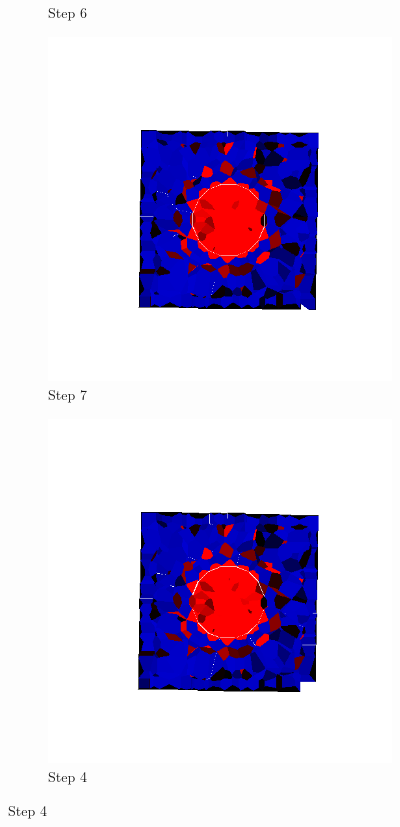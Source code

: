 \begin{figure}[ht!]
\begin{subfigure}{.25\textwidth}
      \caption{Step 6}
      \end{subfigure}%
      \begin{subfigure}{.25\textwidth}
        \centering
        \includegraphics[width=1.0\linewidth]{Files/Small_ASR/IS/DEP5-STEP(007).png}
      \caption{Step 7}
      \end{subfigure}%
      \begin{subfigure}{.25\textwidth}
        \centering
        \includegraphics[width=1.0\linewidth]{Files/Small_ASR/IS/DEP5-STEP(008).png}
      \caption{Step 4}
      \end{subfigure}


\end{figure}
